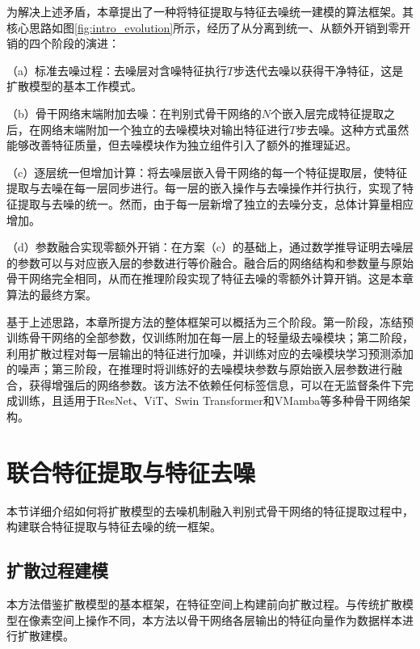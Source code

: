 为解决上述矛盾，本章提出了一种将特征提取与特征去噪统一建模的算法框架\cite{xu2024denoiserep}。其核心思路如图\ref{fig:intro_evolution}所示，经历了从分离到统一、从额外开销到零开销的四个阶段的演进：

（a）标准去噪过程：去噪层对含噪特征执行$T$步迭代去噪以获得干净特征，这是扩散模型的基本工作模式。

（b）骨干网络末端附加去噪：在判别式骨干网络的$N$个嵌入层完成特征提取之后，在网络末端附加一个独立的去噪模块对输出特征进行$T$步去噪。这种方式虽然能够改善特征质量，但去噪模块作为独立组件引入了额外的推理延迟。

（c）逐层统一但增加计算：将去噪层嵌入骨干网络的每一个特征提取层，使特征提取与去噪在每一层同步进行。每一层的嵌入操作与去噪操作并行执行，实现了特征提取与去噪的统一。然而，由于每一层新增了独立的去噪分支，总体计算量相应增加。

（d）参数融合实现零额外开销：在方案（c）的基础上，通过数学推导证明去噪层的参数可以与对应嵌入层的参数进行等价融合。融合后的网络结构和参数量与原始骨干网络完全相同，从而在推理阶段实现了特征去噪的零额外计算开销。这是本章算法的最终方案。

基于上述思路，本章所提方法的整体框架可以概括为三个阶段。第一阶段，冻结预训练骨干网络的全部参数，仅训练附加在每一层上的轻量级去噪模块；第二阶段，利用扩散过程对每一层输出的特征进行加噪，并训练对应的去噪模块学习预测添加的噪声；第三阶段，在推理时将训练好的去噪模块参数与原始嵌入层参数进行融合，获得增强后的网络参数。该方法不依赖任何标签信息，可以在无监督条件下完成训练，且适用于ResNet\cite{he2016deep}、ViT\cite{dosovitskiy2020image}、Swin Transformer\cite{liu2021swin}和VMamba\cite{liu2024vmamba}等多种骨干网络架构。

\section{联合特征提取与特征去噪}
\label{sec:chap3_joint}

本节详细介绍如何将扩散模型的去噪机制融入判别式骨干网络的特征提取过程中，构建联合特征提取与特征去噪的统一框架。

\subsection{扩散过程建模}

本方法借鉴扩散模型的基本框架\cite{ho2020denoising}，在特征空间上构建前向扩散过程。与传统扩散模型在像素空间上操作不同，本方法以骨干网络各层输出的特征向量作为数据样本进行扩散建模。

